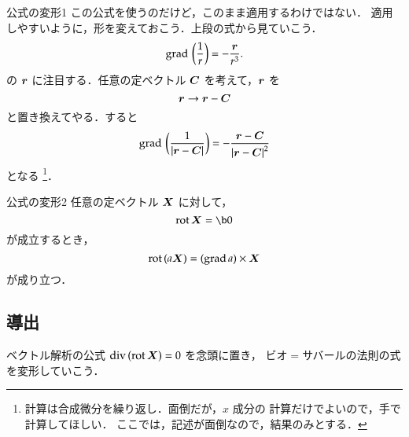         \begin{memo}{公式の変形1}
            この公式を使うのだけど，このまま適用するわけではない．
            適用しやすいように，形を変えておこう．上段の式から見ていこう．
                \begin{equation*}
                    \mathrm{grad}\, \left( \frac{1}{r} \right) = - \frac{\boldsymbol{r}}{r^{3}}.
                \end{equation*}
            の $\boldsymbol{r}$ に注目する．任意の定ベクトル $\boldsymbol{C}$ を考えて，$\boldsymbol{r}$ を
                \begin{equation*}
                    \boldsymbol{r} \rightarrow \boldsymbol{r} - \boldsymbol{C}
                \end{equation*}
            と置き換えてやる．すると
                \begin{equation*}
                    \mathrm{grad}\, \left( \frac{1}{|\boldsymbol{r} - \boldsymbol{C}|} \right)
                    =
                    - \frac{\boldsymbol{r} - \boldsymbol{C}}{{|\boldsymbol{r} - \boldsymbol{C}|}^{2}}
                \end{equation*}
            となる
        \footnote{
                    計算は合成微分を繰り返し．面倒だが，$x$ 成分の
                    計算だけでよいので，手で計算してほしい．
                    ここでは，記述が面倒なので，結果のみとする．
                }．
        \end{memo}

        \begin{memo}{公式の変形2}
            任意の定ベクトル $\boldsymbol{X}$ に対して，
                \begin{equation*}
                    \drot \bX = \b0
                \end{equation*}
            が成立するとき，
                \begin{equation*}
                    \mathrm{rot}\, (a\boldsymbol{X}) = (\mathrm{grad}\, a) \times \boldsymbol{X}
                \end{equation*}
            が成り立つ．
        \end{memo}

    \subsection{導出}
        ベクトル解析の公式 $\mathrm{div}\, (\mathrm{rot}\, \boldsymbol{X}) = 0$ を念頭に置き，
        ビオ$=$サバールの法則の式を変形していこう．

